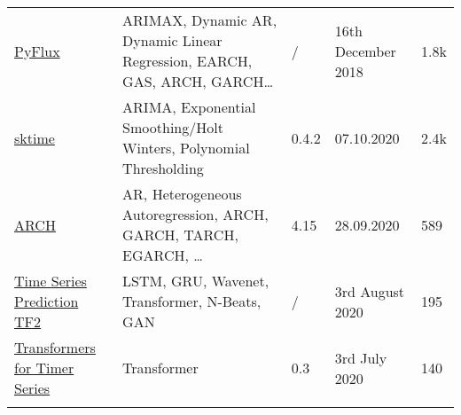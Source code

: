 \begin{table}[h]
{\begin{tabular}{lllll}
            \href{https://github.com/RJT1990/pyflux}{PyFlux}                                            & ARIMAX, Dynamic AR, Dynamic Linear Regression, EARCH, GAS, ARCH, GARCH\ldots                                                                                                                                                                                                                                                                  & /         & 16th December 2018    & 1.8k  \\\addlinespace
            \href{https://github.com/alan-turing-institute/sktime}{sktime}                              & ARIMA, Exponential Smoothing/Holt Winters, Polynomial Thresholding                                                                                                                                                                                                                                                                & 0.4.2     & 07.10.2020            & 2.4k  \\\addlinespace
            \href{https://github.com/bashtage/arch}{ARCH}                                               & AR, Heterogeneous Autoregression, ARCH, GARCH, TARCH, EGARCH, \ldots                                                                                                                                                                                                                                                              & 4.15      & 28.09.2020            & 589   \\\addlinespace
            \href{https://github.com/LongxingTan/Time-series-prediction}{Time Series Prediction TF2}    & LSTM, GRU, Wavenet, Transformer, N-Beats, GAN                                                                                                                                                                                                                                                                                     & /         & 3rd August 2020       & 195   \\\addlinespace
            \href{https://github.com/maxjcohen/transformer}{Transformers for Timer Series}              & Transformer                                                                                                                                                                                                                                                                                                                       & 0.3       & 3rd July 2020         & 140   \\\addlinespace

\end{tabular}}
\end{table}
